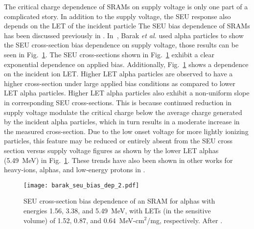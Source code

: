 The critical charge dependence of SRAMs on supply voltage is only one part of a complicated story.
In addition to the supply voltage, the SEU response also depends on the LET of the incident particle
The SEU bias dependence of SRAMs has been discussed previously in \cite{buehler1990alpha,barak1999scaling,barak2004use}.
In~\cite{barak2004use}, Barak \emph{et al.} used alpha particles to show the SEU cross-section bias dependence on supply voltage, those results can be seen in Fig.~\ref{fig:seu_vdd_dep}.
The SEU cross-sections shown in Fig.~\ref{fig:seu_vdd_dep} exhibit a clear exponential dependence on applied bias.
Additionally, Fig.~\ref{fig:seu_vdd_dep} shows a dependence on the incident ion LET.
Higher LET alpha particles are observed to have a higher cross-section under large applied bias conditions as compared to lower LET alpha particles.
Higher LET alpha particles also exhibit a non-uniform slope in corresponding SEU cross-sections.
This is because continued reduction in supply voltage modulate the critical charge below the average charge generated by the incident alpha particles, which in turn results in a moderate increase in the measured cross-section.
Due to the low onset voltage for more lightly ionizing particles, this feature may be reduced or entirely absent from the SEU cross section versus supply voltage figures as shown by the lower LET alphas (5.49~MeV) in Fig.~\ref{fig:seu_vdd_dep}.
These trends have also been shown in other works for heavy-ions, alphas, and low-energy protons in \cite{buehler1990alpha,barak1999scaling,barak2004use,Rodbell:2007vl,Heidel:2008vf}.
\begin{figure}[tb]
    \begin{center}
        \texttt{[image: barak\_seu\_bias\_dep\_2.pdf]}
    \end{center}
    \caption[SEU cross-section bias dependence of an SRAM for alphas with energies 1.56, 3.38, and 5.49~MeV, with LETs (in the sensitive volume) of 1.52, 0.87, and 0.64~MeV-cm$^2$/mg, respectively.]
    {SEU cross-section bias dependence of an SRAM for alphas with energies 1.56, 3.38, and 5.49~MeV, with LETs (in the sensitive volume) of 1.52, 0.87, and 0.64~MeV-cm$^2$/mg, respectively. After \cite{barak2004use}.}
    \label{fig:seu_vdd_dep}
\end{figure}

